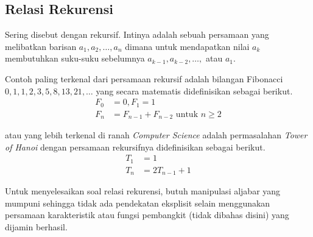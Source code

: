 \subsection{Relasi Rekurensi}
Sering disebut dengan rekursif. Intinya adalah sebuah persamaan yang melibatkan barisan $a_1, a_2, \dots , a_n$ dimana untuk mendapatkan nilai $a_k$ membutuhkan suku-suku sebelumnya $a_{k-1}, a_{k-2}, \dots,$ atau $a_1$. 

Contoh paling terkenal dari persamaan rekursif adalah bilangan Fibonacci $0,1,1,2,3,5,8,13,21,\dots$ yang secara matematis didefinisikan sebagai berikut.
\begin{align*}
    F_0 &= 0, F_1 = 1\\
    F_n &= F_{n-1}+F_{n-2} \text{ untuk } n \ge 2
\end{align*}

atau yang lebih terkenal di ranah \textit{Computer Science} adalah permasalahan \textit{Tower of Hanoi} dengan persamaan rekursifnya didefinisikan sebagai berikut.
\begin{align*}
    T_1 &= 1 \\
    T_n &= 2T_{n-1}+1
\end{align*}

Untuk menyelesaikan soal relasi rekurensi, butuh manipulasi aljabar yang mumpuni sehingga tidak ada pendekatan eksplisit selain menggunakan persamaan karakteristik atau fungsi pembangkit (tidak dibahas disini) yang dijamin berhasil.

